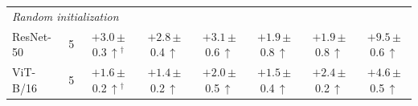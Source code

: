 \begin{table}[htbp]
\begin{tabular}{llcccccc}
\midrule
\multicolumn{8}{l}{\textit{Random initialization}} \\
ResNet-50 & 5 & $+3.0$\,{\scriptsize$\pm$0.3}\,$\uparrow$$^\dagger$ & $+2.8$\,{\scriptsize$\pm$0.4}\,$\uparrow$ & $+3.1$\,{\scriptsize$\pm$0.6}\,$\uparrow$ & $+1.9$\,{\scriptsize$\pm$0.8}\,$\uparrow$ & $+1.9$\,{\scriptsize$\pm$0.8}\,$\uparrow$ & $+9.5$\,{\scriptsize$\pm$0.6}\,$\uparrow$ \\
\addlinespace[2pt]
ViT-B/16 & 5 & $+1.6$\,{\scriptsize$\pm$0.2}\,$\uparrow$$^\dagger$ & $+1.4$\,{\scriptsize$\pm$0.2}\,$\uparrow$ & $+2.0$\,{\scriptsize$\pm$0.5}\,$\uparrow$ & $+1.5$\,{\scriptsize$\pm$0.4}\,$\uparrow$ & $+2.4$\,{\scriptsize$\pm$0.2}\,$\uparrow$ & $+4.6$\,{\scriptsize$\pm$0.5}\,$\uparrow$ \\
\bottomrule
\end{tabular}
\end{table}
